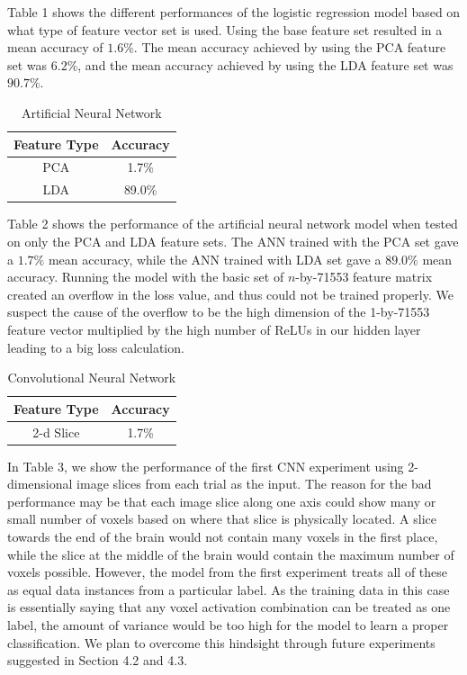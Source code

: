 \documentclass{article} %
\begin{document}
Table 1 shows the different performances of the logistic regression model based on what type of feature vector set is used. Using the base feature set resulted in a mean accuracy of $1.6\%$. The mean accuracy achieved by using the PCA feature set was $6.2\%$, and the mean accuracy achieved by using the LDA feature set was $90.7\%$.

\begin{table}[H]
\centering
\caption{Artificial Neural Network}
\label{my-label}
\begin{tabular}{|c|c|}
\hline
\textbf{Feature Type} & \textbf{Accuracy} \\ \hline
PCA                   &          1.7\%         \\ \hline
LDA                   &         89.0\%          \\ \hline
\end{tabular}
\end{table}

Table 2 shows the performance of the artificial neural network model when tested on only the PCA and LDA feature sets. The ANN trained with the PCA set gave a $1.7\%$ mean accuracy, while the ANN trained with LDA set gave a $89.0\%$ mean accuracy. Running the model with the basic set of $n$-by-71553 feature matrix created an overflow in the loss value, and thus could not be trained properly. We suspect the cause of the overflow to be the high dimension of the 1-by-71553 feature vector multiplied by the high number of ReLUs in our hidden layer leading to a big loss calculation.

\begin{table}[H]
\centering
\caption{Convolutional Neural Network}
\label{my-label}
\begin{tabular}{|c|c|}
\hline
\textbf{Feature Type} & \textbf{Accuracy} \\ \hline
2-d Slice                 &      1.7\%             \\ \hline
\end{tabular}
\end{table}

In Table 3, we show the performance of the first CNN experiment using 2-dimensional image slices from each trial as the input. The reason for the bad performance may be that each image slice along one axis could show many or small number of voxels based on where that slice is physically located. A slice towards the end of the brain would not contain many voxels in the first place, while the slice at the middle of the brain would contain the maximum number of voxels possible. However, the model from the first experiment treats all of these as equal data instances from a particular label. As the training data in this case is essentially saying that any voxel activation combination can be treated as one label, the amount of variance would be too high for the model to learn a proper classification. We plan to overcome this hindsight through future experiments suggested in Section 4.2 and 4.3.
\end{document}
